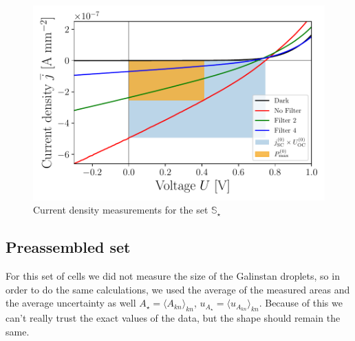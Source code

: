 \documentclass[a4paper,10pt,twocolumn]{article}
\begin{document}
\begin{extract*}
\begin{figure}[ht]\centering
	\includegraphics[width=\columnwidth]{../../../IV-Curve-Analysis/OSCPGraph.pdf}
	\caption{Current density measurements for the set $\mathbb{S}_\star$}
	\label{fig:OSCstarGraph}
\end{figure}


\subsection{Preassembled set}

For this set of cells we did not measure the size of the Galinstan droplets, so in order to do the same calculations, we used the average of the measured areas and the average uncertainty as well $A_\star = \langle A_{kn} \rangle_{kn}$, $u_{A_\star} = \langle u_{A_{kn}}  \rangle_{kn}$. Because of this we can't really trust the exact values of the data, but the shape should remain the same.

\end{extract*}
\end{document}
